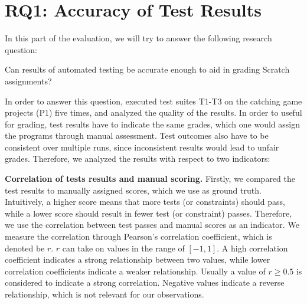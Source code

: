 \section{RQ1: Accuracy of Test Results}

In this part of the evaluation, we will try to answer the following research question:

\begin{center}\begin{minipage}{.9\textwidth}
Can results of automated testing be accurate enough to aid in grading Scratch assignments?
\end{minipage}\end{center}

\noindent In order to answer this question,
executed test suites T1-T3 on the catching game projects (P1) five times,
and analyzed the quality of the results.
In order to useful for grading,
test results have to indicate the same grades,
which one would assign the programs through manual assessment.
Test outcomes also have to be consistent over multiple runs,
since inconsistent results would lead to unfair grades.
Therefore, we analyzed the results with respect to two indicators:
\parspace

\textbf{Correlation of tests results and manual scoring.}
Firstly, we compared the test results to manually assigned scores, which we use as ground truth.
Intuitively, a higher score means that more tests (or constraints) should pass,
while a lower score should result in fewer test (or constraint) passes.
Therefore, we use the correlation between test passes and manual scores as an indicator.
We measure the correlation through Pearson's correlation coefficient, which is denoted be $r$.
$r$ can take on values in the range of $[-1, 1]$.
A high correlation coefficient indicates a strong relationship between two values,
while lower correlation coefficients indicate a weaker relationship.
Usually a value of $r \ge 0.5$ is considered to indicate a strong correlation.
Negative values indicate a reverse relationship, which is not relevant for our observations.
\parspace



